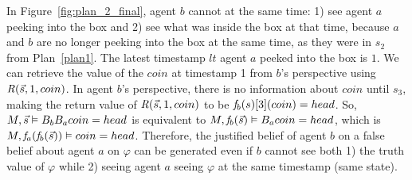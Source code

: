 \begin{example}[Example~\ref{example:coin} with Plan~\ref{plan2}]



In Figure~\ref{fig:plan_2_final}, agent $b$ cannot at the same time: 1) see agent $a$ peeking into the box and 2) see what was inside the box at that time, because $a$ and $b$ are no longer peeking into the box at the same time, as they were in $s_2$ from Plan~\ref{plan1}.
The latest timestamp $lt$ agent $a$ peeked into the box is $1$.
We can retrieve the value of the $coin$ at timestamp 1 from $b$'s perspective using $\mathit{R}(\Vec{s},1,coin)$.
In agent $b$'s perspective, there is no information about $coin$ until $s_3$, making the return value of $\mathit{R}(\Vec{s},1,coin)$ to be $\mathit{f}_b(s)[3](coin)=head$.
So, $M,\Vec{s} \vDash B_b B_a coin=head$ is equivalent to $M,\mathit{f}_b(\Vec{s}) \vDash B_a coin=head $, which is $M,\mathit{f}_a(\mathit{f}_b(\Vec{s})) \vDash coin=head$.
Therefore, the justified belief of agent $b$ on a false belief about agent $a$ on $\varphi$ can be generated even if $b$ cannot see both 1) the truth value of $\varphi$ while 2) seeing agent $a$ seeing $\varphi$ at the same timestamp (same state).
\end{example}








